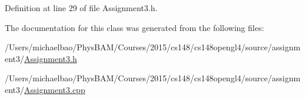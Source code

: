 Definition at line 29 of file Assignment3.\+h.



The documentation for this class was generated from the following files\+:\begin{DoxyCompactItemize}
\item 
/\+Users/michaelbao/\+Phys\+B\+A\+M/\+Courses/2015/cs148/cs148opengl4/source/assignment3/\hyperlink{_assignment3_8h}{Assignment3.\+h}\item 
/\+Users/michaelbao/\+Phys\+B\+A\+M/\+Courses/2015/cs148/cs148opengl4/source/assignment3/\hyperlink{_assignment3_8cpp}{Assignment3.\+cpp}\end{DoxyCompactItemize}
